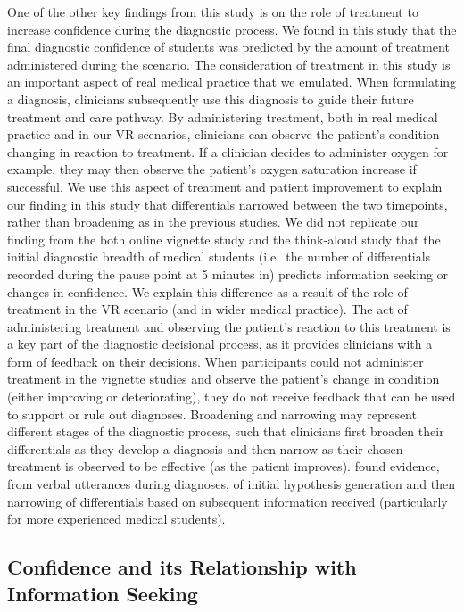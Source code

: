 \documentclass[a4paper, nobind]{templates/ociamthesis}
\begin{document}
One of the other key findings from this study is on the role of treatment to increase confidence during the diagnostic process. We found in this study that the final diagnostic confidence of students was predicted by the amount of treatment administered during the scenario. The consideration of treatment in this study is an important aspect of real medical practice that we emulated. When formulating a diagnosis, clinicians subsequently use this diagnosis to guide their future treatment and care pathway. By administering treatment, both in real medical practice and in our VR scenarios, clinicians can observe the patient's condition changing in reaction to treatment. If a clinician decides to administer oxygen for example, they may then observe the patient's oxygen saturation increase if successful. We use this aspect of treatment and patient improvement to explain our finding in this study that differentials narrowed between the two timepoints, rather than broadening as in the previous studies. We did not replicate our finding from the both online vignette study and the think-aloud study that the initial diagnostic breadth of medical students (i.e.~the number of differentials recorded during the pause point at 5 minutes in) predicts information seeking or changes in confidence. We explain this difference as a result of the role of treatment in the VR scenario (and in wider medical practice). The act of administering treatment and observing the patient's reaction to this treatment is a key part of the diagnostic decisional process, as it provides clinicians with a form of feedback on their decisions. When participants could not administer treatment in the vignette studies and observe the patient's change in condition (either improving or deteriorating), they do not receive feedback that can be used to support or rule out diagnoses. Broadening and narrowing may represent different stages of the diagnostic process, such that clinicians first broaden their differentials as they develop a diagnosis and then narrow as their chosen treatment is observed to be effective (as the patient improves). \textcite{arocha_novice_1995} found evidence, from verbal utterances during diagnoses, of initial hypothesis generation and then narrowing of differentials based on subsequent information received (particularly for more experienced medical students).

\subsection{Confidence and its Relationship with Information Seeking}\label{confidence-and-its-relationship-with-information-seeking}
\end{document}
